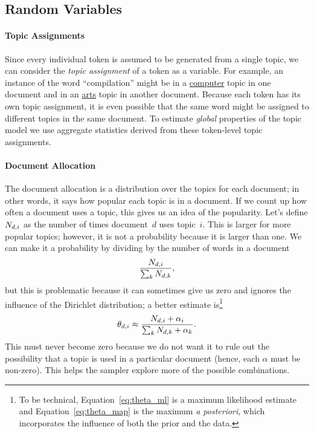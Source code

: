 \subsection{Random Variables}

\paragraph{Topic Assignments}

Since every individual token is assumed to be generated from a single topic,
we can consider the {\em topic assignment} of a token as a variable.  For example,
an instance of the word ``compilation'' might be in a \underline{computer} topic in one
document and in an \underline{arts} topic in another document.  Because each token has its own
topic assignment, it is even possible that the
same word might be assigned to different topics in the same document.
To estimate \emph{global} properties of the topic model we use aggregate statistics derived from these token-level topic assignments.

\paragraph{Document Allocation} The document allocation is a distribution over
the topics for each document; in other words, it says how popular each topic is
in a document.  If we count up how often a document uses a topic, this gives us
an idea of the popularity.  Let's define $N_{d,i}$ as the number of times
document~$d$ uses topic~$i$.  This is larger for more popular topics;
however, it is not a probability because it is larger than one.  We can make it a
probability by dividing by the number of words in a document
\begin{equation}
\frac{N_{d,i}}{\sum_k N_{d,k}},
\label{eq:theta_ml}
\end{equation}
but this is problematic because it can sometimes give us zero and ignores the
influence of the Dirichlet distribution; a better estimate is\footnote{To be
  technical, Equation~\ref{eq:theta_ml} is a maximum likelihood estimate and
  Equation~\ref{eq:theta_map} is the maximum \textit{a posteriori}, which
  incorporates the influence of both the prior and the data.}
\begin{equation}
\theta_{d,i} \approx \frac{N_{d,i} + \alpha_i}{\sum_k N_{d,k} + \alpha_k}.
\label{eq:theta_map}
\end{equation}
This must never become zero because we do not want it to rule out the possibility
that a topic is used in a particular document (hence, each $\alpha$
must be non-zero).  This helps the sampler
explore more of the possible combinations.

